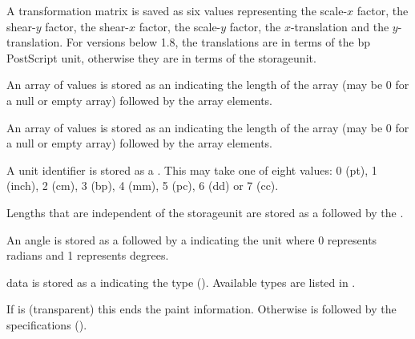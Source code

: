 \begin{deflist}
\begin{itemdesc}
A transformation matrix is saved as six  values
representing the scale-$x$ factor, the shear-$y$
factor, the shear-$x$ factor, the scale-$y$
factor, the $x$-translation and the
$y$-translation. For versions below 1.8, the translations
are in terms of the \gls{bp} PostScript unit, otherwise they are in
terms of the \gls{storageunit}.
\end{itemdesc}

\begin{itemdesc}
An array of  values is stored as an 
 indicating the length of the array (may be 0 for a null or empty
array) followed by the   array elements.
\end{itemdesc}

\begin{itemdesc}
An array of  values is stored as an 
 indicating the length of the array (may be 0 for a null or empty
array) followed by the   array elements.
\end{itemdesc}

\begin{itemdesc}
A unit identifier is stored as a . This may take one of eight
values: 0 (\gls{pt}), 1 (inch), 2 (cm), 3 (\gls{bp}), 4 (mm), 5
(\gls{pc}), 6 (\gls{dd}) or 7 (\gls{cc}).
\end{itemdesc}

\begin{itemdesc}
Lengths that are independent of the \gls{storageunit} are stored as a
 followed by the .
\end{itemdesc}

\begin{itemdesc}
An angle is stored as a  followed by a 
indicating the unit where 0 represents radians and 1 represents
degrees.
\end{itemdesc}

\begin{itemdesc}
 data is stored as a  indicating the
 type ().  Available types are listed in
.

If  is  (transparent) this ends the paint
information. Otherwise  is followed by the
 specifications ().


\end{itemdesc}
\end{deflist}
